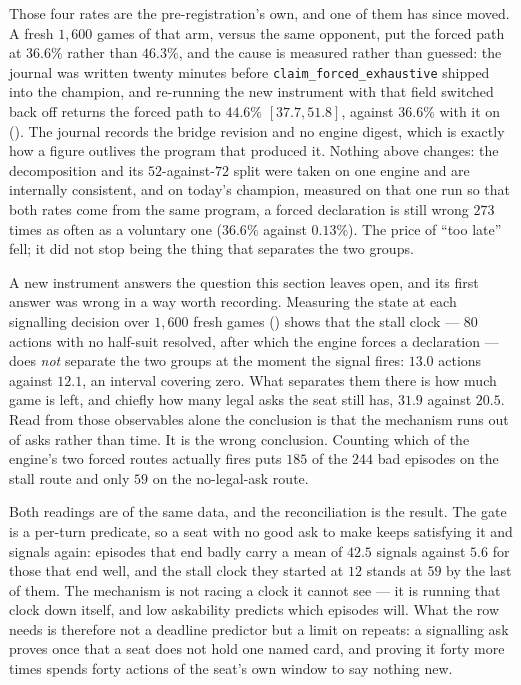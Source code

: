 \documentclass[11pt,letterpaper]{article}
\begin{document}
Those four rates are the pre-registration's own, and one of them has since
moved. A fresh $1{,}600$ games of that arm, versus the same opponent, put
the forced path at $36.6\%$ rather than $46.3\%$, and the cause is measured
rather than guessed: the journal was written twenty minutes before
\texttt{claim\_forced\_exhaustive} shipped into the champion, and re-running
the new instrument with that field switched back off returns the forced path
to $44.6\%$ $[37.7, 51.8]$, against $36.6\%$ with it on
(). The journal records the
bridge revision and no engine digest, which is exactly how a figure outlives
the program that produced it. Nothing above changes: the decomposition and
its $52$-against-$72$ split were taken on one engine and are internally
consistent, and on today's champion, measured on that one run so that both
rates come from the same program, a forced declaration is still wrong
$273$ times as often as a voluntary one ($36.6\%$ against $0.13\%$). The price of ``too late'' fell; it
did not stop being the thing that separates the two groups.

A new instrument answers the question this section leaves open, and its first
answer was wrong in a way worth recording. Measuring the state at each
signalling decision over $1{,}600$ fresh games
() shows that the stall clock ---
$80$ actions with no half-suit resolved, after which the engine forces a
declaration --- does \emph{not} separate the two groups at the moment the
signal fires: $13.0$ actions against $12.1$, an interval covering zero. What
separates them there is how much game is left, and chiefly how many legal asks
the seat still has, $31.9$ against $20.5$. Read from those observables alone
the conclusion is that the mechanism runs out of asks rather than time. It is
the wrong conclusion. Counting which of the engine's two forced routes actually
fires puts $185$ of the $244$ bad episodes on the stall route and only $59$ on
the no-legal-ask route.

Both readings are of the same data, and the reconciliation is the result. The
gate is a per-turn predicate, so a seat with no good ask to make keeps
satisfying it and signals again: episodes that end badly carry a mean of $42.5$
signals against $5.6$ for those that end well, and the stall clock they started
at $12$ stands at $59$ by the last of them. The mechanism is not racing a clock
it cannot see --- it is running that clock down itself, and low askability
predicts which episodes will. What the row needs is therefore not a deadline
predictor but a limit on repeats: a signalling ask proves once that a seat does
not hold one named card, and proving it forty more times spends forty actions
of the seat's own window to say nothing new.
\end{document}
